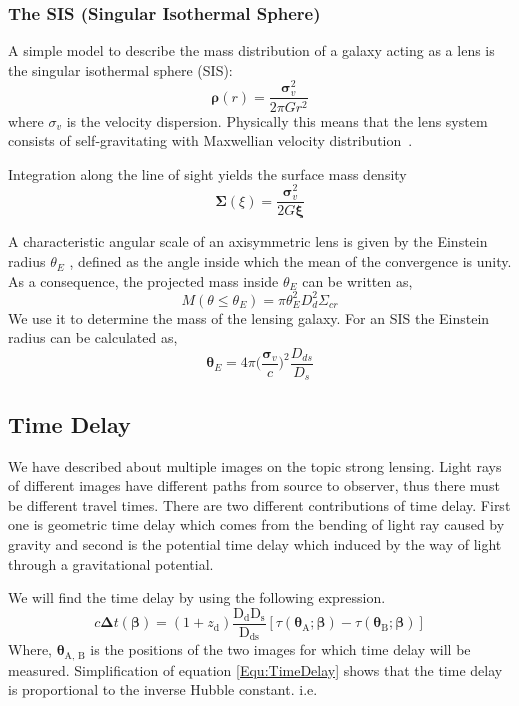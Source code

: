 \subsubsection{The SIS (Singular Isothermal Sphere)}
A simple model to describe the mass distribution of a galaxy acting as a lens is the singular isothermal sphere (SIS):
\begin{equation}
\pmb\rho(r)=\frac{\pmb\sigma_{v}^{2}}{2\pi G r^2}
\label{equ:SIS}
\end{equation}
where $ \sigma_{v} $ is the velocity dispersion. Physically this means that the lens system consists of self-gravitating with Maxwellian velocity distribution~\cite{Schneider}.

Integration along the line of sight yields the surface mass density
\begin{equation}
\pmb\Sigma(\xi)=\frac{\pmb\sigma^2_{v}}{2G\pmb\xi}
\label{equ:Sigma(xi)}
\end{equation}

\noindent
A characteristic angular scale of an axisymmetric lens is given by the Einstein radius $ \theta_{E} $ , defined as the angle inside which the mean of the convergence is unity. As a consequence, the projected mass inside $ \theta_{E} $ can be written as,
\begin{equation}
M(\theta \le \theta_{E})=\pi \theta^2_{E}D^2_{d}\Sigma_{cr}
\end{equation}
\noindent
We use it to determine the mass of the lensing galaxy. For an SIS the Einstein radius can be calculated as,
\begin{equation}
\pmb\theta_{E}=4\pi\bigg( \frac{\pmb\sigma_{v}}{c}\bigg)^2\frac{D_{ds}}{D_{s}}
\label{Equ:ThetaE}
\end{equation}

\subsection{Time Delay}
We have described about multiple images on the topic strong lensing. Light rays of different images have different paths from source to observer, thus there must be different travel times. There are two different contributions of time delay. First one is geometric time delay which comes from the bending of light ray caused by gravity and second is the potential time delay which induced by the way of light through a gravitational potential.

We will find the time delay by using the following expression.
\begin{equation}
c\pmb\Delta t(\pmb\beta)=(1+z_{\text{d}})\frac{\text{D}_{\text{d}}\text{D}_{\text{s}}}{\text{D}_{\text{ds}}}[\tau(\pmb\theta_{\text{A}}; \pmb\beta)-\tau(\pmb\theta_{\text{B}}; \pmb\beta)]
\label{Equ:TimeDelay}
\end{equation}
\noindent
Where, $ \pmb\theta_{\text{A, B}} $ is the positions of the two images for which time delay will be measured. Simplification of equation \ref{Equ:TimeDelay} shows that the time delay is proportional to the inverse Hubble constant. i.e.

